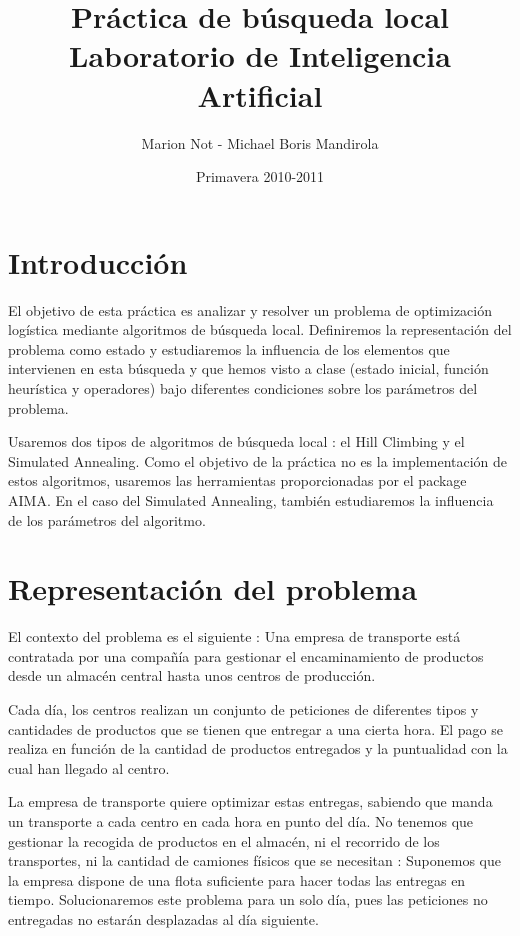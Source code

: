 \documentclass{article}
\title{\Huge{Práctica de búsqueda local} \\
\vspace{15mm}
   \Large{Laboratorio de Inteligencia Artificial}}
\author{Marion Not - Michael Boris Mandirola}
\date{Primavera 2010-2011}
\begin{document}
\maketitle

\newpage

\tableofcontents

\newpage

\section*{Introducción}

El objetivo de esta práctica es analizar y resolver un problema de optimización
logística mediante algoritmos de búsqueda local. Definiremos la representación
del problema como estado y estudiaremos la influencia de los elementos que
intervienen en esta búsqueda y que hemos visto a clase (estado inicial, función
heurística y operadores) bajo diferentes condiciones sobre los parámetros del
problema.

Usaremos dos tipos de algoritmos de búsqueda local : el Hill Climbing y el
Simulated Annealing. Como el objetivo de la práctica no es la implementación de
estos algoritmos, usaremos las herramientas proporcionadas por el package AIMA. 
En el caso del Simulated Annealing, también estudiaremos la influencia de los 
parámetros del algoritmo.

\section{Representación del problema}

El contexto del problema es el siguiente : Una empresa de transporte está
contratada por una compañía para gestionar el encaminamiento de productos desde
un almacén central hasta unos centros de producción.

Cada día, los centros realizan un conjunto de peticiones de diferentes tipos y 
cantidades de productos que se tienen que entregar a una cierta hora. El pago se
realiza en función de la cantidad de productos entregados y la puntualidad con
la cual han llegado al centro.

La empresa de transporte quiere optimizar estas entregas, sabiendo que manda un
transporte a cada centro en cada hora en punto del día.
No tenemos que gestionar la recogida de productos en el almacén, ni el recorrido
de los transportes, ni la cantidad de camiones físicos que se necesitan :
Suponemos que la empresa dispone de una flota suficiente para hacer todas las
entregas en tiempo.
Solucionaremos este problema para un solo día, pues las peticiones no entregadas
no estarán desplazadas al día siguiente.
\end{document}
